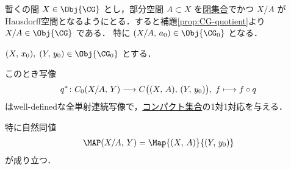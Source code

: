 \documentclass[algtopo_main]{subfiles}
\begin{document}
\begin{marker}
    暫くの間 $X \in \Obj{\CG}$ とし，部分空間 $A \subset X$ を\underline{閉集合}でかつ $X/A$ がHausdorff空間となるようにとる．すると補題\ref{prop:CG-quotient}より $X/A \in \Obj{\CG}$ である．
    特に $(X/A,\, a_0) \in \Obj{\CG_0}$ となる．
\end{marker}



\begin{mylem}[label=lem:CG0-collapse]{}
    $(X,\, x_0),\; (Y,\, y_0) \in \Obj{\CG_0}$ とする．
    
    このとき写像
    \begin{align}
        q^* \colon C_0 (X/A,\, Y) \longrightarrow C \bigl( (X,\, A),\, (Y,\, y_0) \bigr),\; f \longmapsto f \circ q
    \end{align}
    はwell-definedな全単射連続写像で，\hyperref[def:compact]{コンパクト集合}の1対1対応を与える．
    
    特に自然同値
    \begin{align}
        \MAP(X/A,\, Y) = \Map{(X,\, A)}{(Y,\, y_0)}
    \end{align}
    が成り立つ．
\end{mylem}
\end{document}
